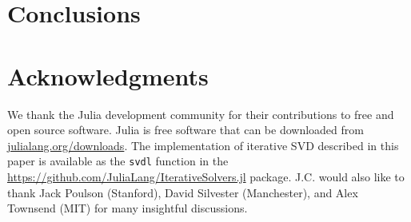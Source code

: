 \documentclass[final,leqno]{siamltex1213}
\begin{document}
\section{Conclusions}



\section*{Acknowledgments}

We thank the Julia development community for their contributions to free and
open source software. Julia is free software that can be downloaded from
\url{julialang.org/downloads}. The implementation of iterative SVD described in
this paper is available as the \verb|svdl| function in the
\href{IterativeSolvers.jl}{https://github.com/JuliaLang/IterativeSolvers.jl}
package. J.C. would also like to thank Jack Poulson (Stanford), David Silvester
(Manchester), and Alex Townsend (MIT) for many insightful discussions.


\end{document}

